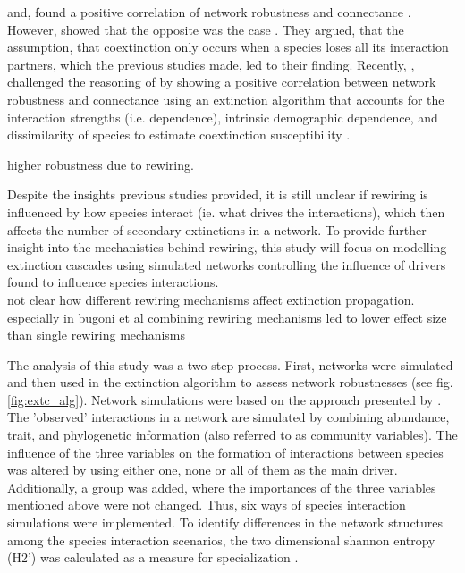 \documentclass[12pt,a4paper]{article}
\begin{document}
\citeauthor{Dunne2002, Ekloef2006} and, \citeauthor{Thebault2010} found a positive correlation of network robustness and connectance \parencite{Dunne2002, Ekloef2006, Thebault2010}. However, \citeauthor{Vieira2015} showed that the opposite was the case \parencite{Vieira2015}. They argued, that the assumption, that coextinction only occurs when a species loses all its interaction partners, which the previous studies made, led to their finding. Recently, \citeauthor{Baumgartner2020}, challenged the reasoning of \citeauthor{Vieira2015} by showing a positive correlation between network robustness and connectance using an extinction algorithm that accounts for the interaction strengths (i.e. dependence), intrinsic demographic dependence, and dissimilarity of species to estimate coextinction susceptibility \parencite{Baumgartner2020}. 


\parencite{Kaiser-Bunbury2010, Schleuning2016, Timoteo2016, Costa2018} higher robustness due to rewiring. %


Despite the insights previous studies provided, it is still unclear if rewiring is influenced by how species interact (ie. what drives the interactions), which then affects the number of secondary extinctions in a network. To provide further insight into the mechanistics behind rewiring, this study will focus on modelling extinction cascades using simulated networks controlling the influence of drivers found to influence species interactions.\\

	not clear how different rewiring mechanisms affect extinction propagation. especially in bugoni et al combining rewiring mechanisms led to lower effect size than single rewiring mechanisms

The analysis of this study was a two step process. First, networks were simulated and then used in the extinction algorithm to assess network robustnesses (see fig. \ref{fig:extc_alg}).  
Network simulations were based on the approach presented by \citeauthor{Benadi} \parencite{Benadi}. The 'observed' interactions in a network are simulated by combining abundance, trait, and phylogenetic information (also referred to as community variables). The influence of the three variables on the formation of interactions between species was altered by using either one, none or all of them as the main driver. Additionally, a group was added, where the importances of the three variables mentioned above were not changed. Thus, six ways of species interaction simulations were implemented.
To identify differences in the network structures among the species interaction scenarios, the two dimensional shannon entropy (H2') was calculated as a measure for specialization \parencite{Blüthgen2006}.
\end{document}
